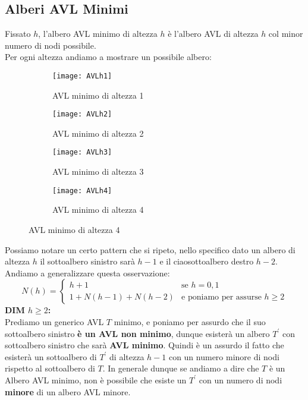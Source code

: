 \subsection{Alberi AVL Minimi}
Fissato $h$, l'albero AVL minimo di altezza $h$ è l'albero AVL di altezza $h$ col minor numero di nodi possibile.\\
Per ogni altezza andiamo a mostrare un possibile albero:

\begin{figure}[H]
    \centering
    \begin{subfigure}[b]{0.35\textwidth}
        \texttt{[image: AVLh1]} 
        \caption{AVL minimo di altezza 1}
    \end{subfigure}
    \hfill
    \begin{subfigure}[b]{0.45\textwidth}
        \texttt{[image: AVLh2]} 
        \caption{AVL minimo di altezza 2}
    \end{subfigure}
    \hfill
    \begin{subfigure}[b]{0.45\textwidth}
        \texttt{[image: AVLh3]} 
        \caption{AVL minimo di altezza 3}
    \end{subfigure}
    \hfill
    \begin{subfigure}[b]{0.45\textwidth}
        \texttt{[image: AVLh4]} 
        \caption{AVL minimo di altezza 4}
    \end{subfigure}
\end{figure}
Possiamo notare un certo pattern che si ripeto, nello specifico dato un albero di altezza $h$ il sottoalbero sinistro sarà $h-1$ e il ciaosottoalbero destro $h-2$.\\
Andiamo a generalizzare questa osservazione:
$$ N(h)= \begin{cases}
    h+1 & \text{se } h=0,1\\
    1+N(h-1)+N(h-2) & \text{e poniamo per assurse } h \ge 2
\end{cases} $$
\textbf{DIM $h \ge 2$:}\\
Prediamo un generico AVL $T$ minimo, e poniamo per assurdo che il suo sottoalbero sinistro \textbf{è un AVL non minimo}, dunque esisterà un albero $T^{\prime}$ con sottoalbero sinistro che sarà \textbf{AVL minimo}. Quindi è un assurdo il fatto che esisterà un sottoalbero di $T^{\prime}$ di altezza $h-1$ con un numero minore di nodi rispetto al sottoalbero di $T$. In generale dunque se andiamo a dire che $T$ è un Albero AVL minimo, non è possibile che esiste un $T^{\prime}$ con un numero di nodi \textbf{minore} di un albero AVL minore.

